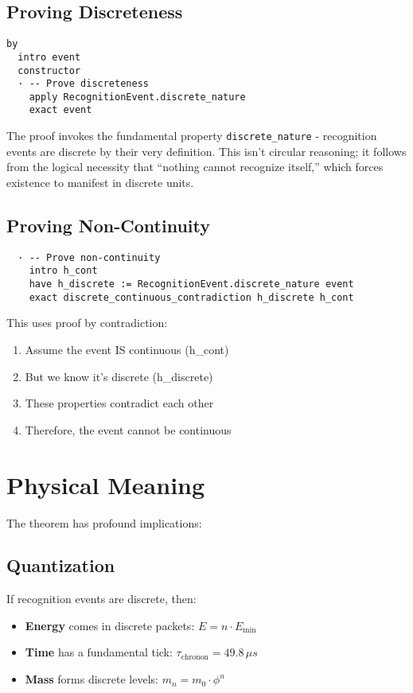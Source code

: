 \documentclass[11pt]{article}
\theoremstyle{definition}
\begin{document}
\subsection{Proving Discreteness}
\begin{verbatim}
by
  intro event
  constructor
  · -- Prove discreteness
    apply RecognitionEvent.discrete_nature
    exact event
\end{verbatim}

The proof invokes the fundamental property \texttt{discrete\_nature} - recognition events are discrete by their very definition. This isn't circular reasoning; it follows from the logical necessity that ``nothing cannot recognize itself,'' which forces existence to manifest in discrete units.

\subsection{Proving Non-Continuity}
\begin{verbatim}
  · -- Prove non-continuity
    intro h_cont
    have h_discrete := RecognitionEvent.discrete_nature event
    exact discrete_continuous_contradiction h_discrete h_cont
\end{verbatim}

This uses proof by contradiction:
\begin{enumerate}
    \item Assume the event IS continuous (h\_cont)
    \item But we know it's discrete (h\_discrete)
    \item These properties contradict each other
    \item Therefore, the event cannot be continuous
\end{enumerate}

\section{Physical Meaning}

The theorem has profound implications:

\subsection{Quantization}
If recognition events are discrete, then:
\begin{itemize}
    \item \textbf{Energy} comes in discrete packets: $E = n \cdot E_{\text{min}}$
    \item \textbf{Time} has a fundamental tick: $\tau_{\text{chronon}} = 49.8 \, \mu s$
    \item \textbf{Mass} forms discrete levels: $m_n = m_0 \cdot \phi^n$
\end{itemize}
\end{document}
